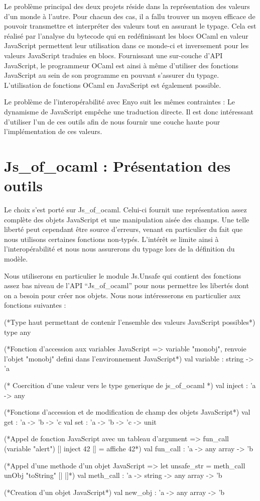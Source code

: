 \documentclass[11pt,a4paper]{report}
\begin{document}
Le problème principal des deux projets réside dans la représentation des valeurs
d'un monde à l'autre. Pour chacun des cas, il a fallu trouver un moyen efficace de
pouvoir transmettre et interpréter des valeurs tout en assurant le typage.
Cela est réalisé par l'analyse du bytecode qui en redéfinissant les blocs OCaml
en valeur JavaScript permettent leur utilisation dans ce monde-ci et inversement pour
les valeurs JavaScript traduies en blocs. Fournissant une sur-couche d'API JavaScript,
le programmeur OCaml est ainsi à même d'utiliser des fonctions JavaScript au sein de son
programme en pouvant s'assurer du typage. L'utilisation de fonctions OCaml en JavaScript
est également possible.

Le problème de l'interopérabilité avec Enyo suit les mêmes contraintes :
Le dynamisme de JavaScript empêche une traduction directe. Il est donc intéressant
d'utiliser l'un de ces outils afin de nous fournir une couche haute pour l'implémentation de
ces valeurs.


\section{Js\_of\_ocaml : Présentation des outils}

Le choix s'est porté sur Js\_of\_ocaml. Celui-ci fournit une représentation assez complète des
objets JavaScript et une manipulation aisée des champs. Une telle liberté peut cependant être source
d'erreurs, venant en particulier du fait que nous utilisons certaines fonctions non-typés.
L'intérêt se limite ainsi à l'interopérabilité et nous nous assurerons du typage lors de la définition
du modèle.

Nous utiliserons en particulier le module Js.Unsafe qui contient des fonctions assez bas niveau
de l'API ``Js\_of\_ocaml'' pour nous permettre les libertés dont on a besoin pour créer nos objets.
Nous nous intéresserons en particulier aux fonctions suivantes :

\begin{OCaml}
(*Type haut permettant de contenir l'ensemble des valeurs JavaScript possibles*)
type any

(*Fonction d'accession aux variables JavaScript
  => variable "monobj", renvoie l'objet "monobj" defini dans l'environnement JavaScript*)
val variable : string -> 'a

(* Coercition d'une valeur vers le type generique de js_of_ocaml *)
val inject : 'a -> any

(*Fonctions d'accession et de modification de champ des objets JavaScript*)
val get : 'a -> 'b -> 'c
val set : 'a -> 'b -> 'c -> unit

(*Appel de fonction JavaScript avec un tableau d'argument
  => fun_call (variable "alert") [| inject 42 |]
  = affiche 42*)
val fun_call : 'a -> any array -> 'b

(*Appel d'une methode d'un objet JavaScript
  => let unsafe_str = meth_call unObj "toString" [| |]*)
val meth_call : 'a -> string -> any array -> 'b

(*Creation d'un objet JavaScript*)
val new_obj : 'a -> any array -> 'b
\end{OCaml}
\end{document}
